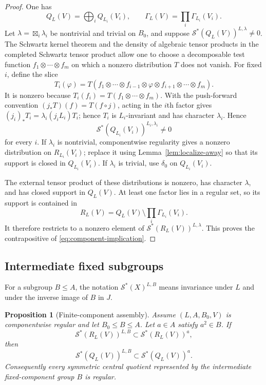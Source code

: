 \documentclass[11pt,reqno]{amsart}
\numberwithin{equation}{section}
\newtheorem{proposition}[theorem]{Proposition}
\theoremstyle{definition}
\theoremstyle{remark}
\newcommand{\cS}{\mathcal S}
\begin{document}
\begin{proof}
One has
\[
 Q_L(V)=\bigoplus_iQ_{L_i}(V_i),
 \qquad
 \Gamma_L(V)=\prod_i\Gamma_{L_i}(V_i).
\]
Let $\lambda=\boxtimes_i\lambda_i$ be nontrivial and trivial on $B_0$, and
suppose $\cS^*(Q_L(V))^{L,\lambda}\ne0$.  The Schwartz kernel theorem and the
density of algebraic tensor products in the completed Schwartz tensor product
\cite{AGSchwartz} allow one to choose a decomposable test function
$f_1\otimes\cdots\otimes f_m$ on which a nonzero distribution $T$ does not
vanish.  For fixed $i$, define the slice
\[
 T_i(\varphi)=T(f_1\otimes\cdots\otimes f_{i-1}\otimes\varphi
                  \otimes f_{i+1}\otimes\cdots\otimes f_m).
\]
It is nonzero because $T_i(f_i)=T(f_1\otimes\cdots\otimes f_m)$.  With the push-forward convention
$(j_*T)(f)=T(f\circ j)$, acting in the $i$th factor gives
$(j_i)_*T_i=\lambda_i(j_iL_i)T_i$; hence $T_i$ is $L_i$-invariant and has
character $\lambda_i$.  Hence
\[
 \cS^*(Q_{L_i}(V_i))^{L_i,\lambda_i}\ne0
\]
for every $i$.  If $\lambda_i$ is nontrivial, componentwise regularity gives a
nonzero distribution on $R_{L_i}(V_i)$; replace it using
Lemma~\ref{lem:localize-away} so that its support is closed in
$Q_{L_i}(V_i)$.  If $\lambda_i$ is trivial, use $\delta_0$ on
$Q_{L_i}(V_i)$.

The external tensor product of these distributions is nonzero, has character
$\lambda$, and has closed support in $Q_L(V)$.  At least one factor lies in a
regular set, so its support is contained in
\[
 R_L(V)=Q_L(V)\setminus\prod_i\Gamma_{L_i}(V_i).
\]
It therefore restricts to a nonzero element of
$\cS^*(R_L(V))^{L,\lambda}$.  This proves the contrapositive of
\eqref{eq:component-implication}.
\end{proof}

\subsection{Intermediate fixed subgroups}

For a subgroup $B\leq A$, the notation $\cS^*(X)^{L,B}$ means invariance under
$L$ and under the inverse image of $B$ in $J$.

\begin{proposition}[Finite-component assembly]\label{prop:finite-assembly}
Assume $(L,A,B_0,V)$ is componentwise regular and let
$B_0\leq B\leq A$.  Let $a\in A$ satisfy $a^2\in B$.  If
\[
 \cS^*(R_L(V))^{L,B}\subset\cS^*(R_L(V))^a,
\]
then
\[
 \cS^*(Q_L(V))^{L,B}\subset\cS^*(Q_L(V))^a.
\]
Consequently every symmetric central quotient represented by the intermediate
fixed-component group $B$ is regular.
\end{proposition}
\end{document}
